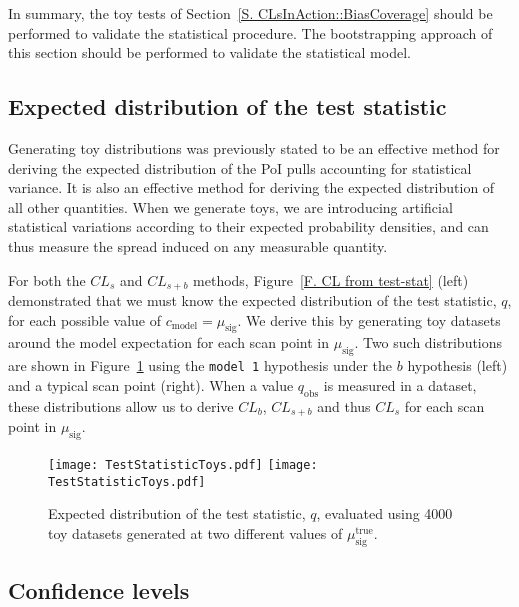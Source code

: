 In summary, the toy tests of Section~\ref{S. CLsInAction::BiasCoverage} should be performed to validate the statistical procedure. The bootstrapping approach of this section should be performed to validate the statistical model.





\subsection{Expected distribution of the test statistic}
\label{S. CLsInAction::TestStatDist}

Generating toy distributions was previously stated to be an effective method for deriving the expected distribution of the PoI pulls accounting for statistical variance. It is also an effective method for deriving the expected distribution of all other quantities. When we generate toys, we are introducing artificial statistical variations according to their expected probability densities, and can thus measure the spread induced on any measurable quantity.

For both the $CL_s$ and $CL_{s+b}$ methods, Figure~\ref{F. CL from test-stat} (left) demonstrated that we must know the expected distribution of the test statistic, $q$, for each possible value of $c_\text{model}=\mu_\text{sig}$. We derive this by generating toy datasets around the model expectation for each scan point in $\mu_\text{sig}$. Two such distributions are shown in Figure~\ref{F. q dist} using the \texttt{model 1} hypothesis under the $b$ hypothesis (left) and a typical scan point (right). When a value $q_\text{obs}$ is measured in a dataset, these distributions allow us to derive $CL_{b}$, $CL_{s+b}$ and thus $CL_s$ for each scan point in $\mu_\text{sig}$.


\begin{figure}[t!]
\centering
\texttt{[image: TestStatisticToys.pdf]}
\texttt{[image: TestStatisticToys.pdf]}
\caption{Expected distribution of the test statistic, $q$, evaluated using 4000 toy datasets generated at two different values of $\mu_\text{sig}^\text{true}$.}
\label{F. q dist}
\end{figure}





\subsection{Confidence levels}
\label{S. CLsInAction::ConfidenceLevels}


